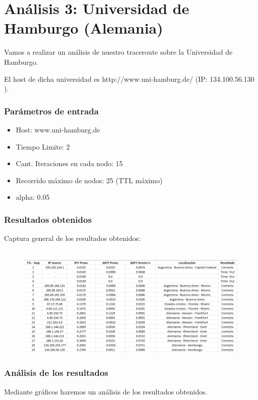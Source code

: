 \section{An\'alisis 3: Universidad de Hamburgo (Alemania)}
Vamos a realizar un an\'alisis de nuestro traceroute sobre la Universidad de Hamburgo.

El host de dicha universidad es http://www.uni-hamburg.de/ (IP: 134.100.56.130 ).\\	


\subsubsection{Par\'ametros de entrada}
\begin{itemize}
\item Host: www.uni-hamburg.de
\item Tiempo Limite: 2
\item Cant. Iteraciones en cada nodo: 15
\item Recorrido m\'aximo de nodos: 25 (TTL m\'aximo)
\item alpha: 0.05
\end{itemize}

\subsubsection{Resultados obtenidos}

Captura general de los resultados obtenidos: 
\\
\\
\newpage
\begin{figure}[h]
	\begin{center}
    \includegraphics[width=1\textwidth]{img_analisis3/captura.png} 
	\end{center} 
\end{figure}

\subsubsection{An\'alisis de los resultados}
Mediante gr\'aficos haremos un an\'alisis de los resultados obtenidos. \newline


